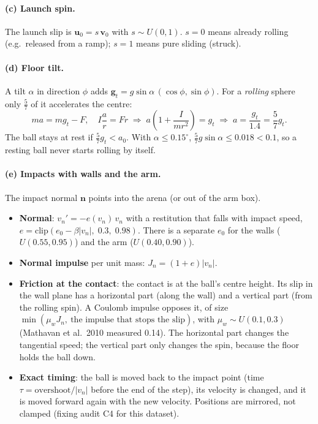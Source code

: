 \documentclass[11pt,a4paper]{article}
\newcommand{\vv}{\bm v}\newcommand{\pp}{\bm p}\newcommand{\uu}{\bm u}
\begin{document}
\paragraph{(c) Launch spin.} The launch slip is $\uu_0 = s\,\vv_0$ with $s\sim U(0,1)$. $s=0$ means already rolling (e.g.\
released from a ramp); $s=1$ means pure sliding (struck).

\paragraph{(d) Floor tilt.} A tilt $\alpha$ in direction $\phi$ adds $\bm g_t = g\sin\alpha\,(\cos\phi,\sin\phi)$. For a
\emph{rolling} sphere only $\frac57$ of it accelerates the centre:
\[ m a = m g_t - F,\quad I\frac{a}{r}=F r\;\Rightarrow\; a\left(1+\frac{I}{mr^2}\right)=g_t \;\Rightarrow\; a=\frac{g_t}{1.4}=\frac57 g_t. \]
The ball stays at rest if $\frac57 g_t < a_0$. With $\alpha\le0.15^\circ$, $\frac57 g\sin\alpha\le0.018<0.1$, so a resting
ball never starts rolling by itself.

\paragraph{(e) Impacts with walls and the arm.} The impact normal $\bm n$ points into the arena (or out of the arm box).
\begin{itemize}
\item \textbf{Normal}: $v_n' = -e(v_n)\,v_n$ with a restitution that falls with impact speed,
  $e = \mathrm{clip}(e_0-\beta|v_n|,\;0.3,\;0.98)$. There is a separate $e_0$ for the walls ($U(0.55,0.95)$) and the
  arm ($U(0.40,0.90)$).
\item \textbf{Normal impulse} per unit mass: $J_n=(1+e)|v_n|$.
\item \textbf{Friction at the contact}: the contact is at the ball's centre height. Its slip in the wall plane has a
  horizontal part (along the wall) and a vertical part (from the rolling spin). A Coulomb impulse opposes it, of size
  $\min(\mu_w J_n,\ \text{the impulse that stops the slip})$, with $\mu_w\sim U(0.1,0.3)$ (Mathavan et al.\ 2010
  measured 0.14). The horizontal part changes the tangential speed; the vertical part only changes the spin, because the
  floor holds the ball down.
\item \textbf{Exact timing}: the ball is moved back to the impact point (time $\tau=\text{overshoot}/|v_n|$ before the end
  of the step), its velocity is changed, and it is moved forward again with the new velocity. Positions are mirrored,
  not clamped (fixing audit C4 for this dataset).
\end{itemize}
\end{document}
